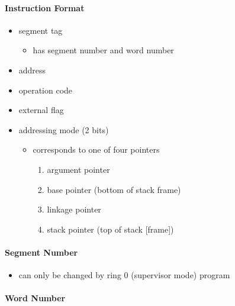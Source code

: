 \documentclass[
  12pt]{findlay}
\providecommand{\tightlist}{%
  \setlength{\itemsep}{0pt}\setlength{\parskip}{0pt}}
\begin{document}
\hypertarget{instruction-format}{%
\paragraph{Instruction Format}\label{instruction-format}}

\begin{itemize}
\tightlist
\item
  segment tag

  \begin{itemize}
  \tightlist
  \item
    has segment number and word number
  \end{itemize}
\item
  address
\item
  operation code
\item
  external flag
\item
  addressing mode (2 bits)

  \begin{itemize}
  \tightlist
  \item
    corresponds to one of four pointers

    \begin{enumerate}
    \def\labelenumi{(\arabic{enumi})}
    \tightlist
    \item
      argument pointer
    \item
      base pointer (bottom of stack frame)
    \item
      linkage pointer
    \item
      stack pointer (top of stack {[}frame{]})
    \end{enumerate}
  \end{itemize}
\end{itemize}

\hypertarget{segment-number}{%
\paragraph{Segment Number}\label{segment-number}}

\begin{itemize}
\tightlist
\item
  can only be changed by ring 0 (supervisor mode) program
\end{itemize}

\hypertarget{word-number}{%
\paragraph{Word Number}\label{word-number}}
\end{document}
